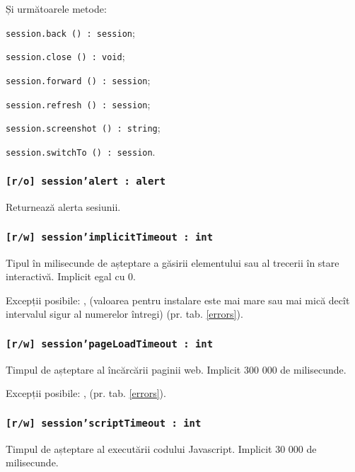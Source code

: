 Și următoarele metode:
\begin{icItems}
	\item \texttt{session.back () : session};
	\item \texttt{session.close () : void};
	\item \texttt{session.forward () : session};
	\item \texttt{session.refresh () : session};
	\item \texttt{session.screenshot () : string};
	\item \texttt{session.switchTo () : session}.
\end{icItems}

\subsubsection{\texttt{[r/o] session'alert : alert}}

Returnează alerta sesiunii.

\subsubsection{\texttt{[r/w] session'implicitTimeout : int}}

Tipul în milisecunde de așteptare a găsirii elementului sau al trecerii în stare interactivă. Implicit egal cu 0.

Excepții posibile: ,  (valoarea pentru instalare este mai mare sau mai mică decît intervalul sigur al numerelor întregi) (pr. tab. \ref{errors}).

\subsubsection{\texttt{[r/w] session'pageLoadTimeout : int}}

Timpul de așteptare al încărcării paginii web. Implicit 300 000 de milisecunde.

Excepții posibile: ,  (pr. tab. \ref{errors}).

\subsubsection{\texttt{[r/w] session'scriptTimeout : int}}

Timpul de așteptare al executării codului Javascript. Implicit 30 000 de milisecunde.

